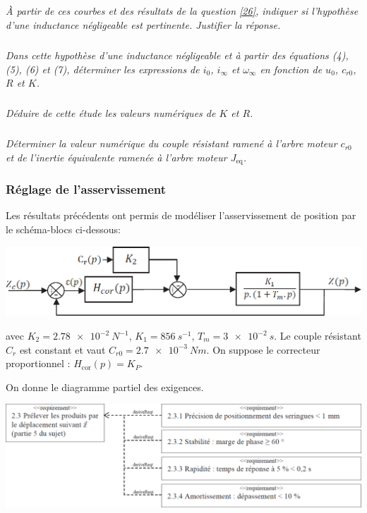 \documentclass[10pt,fleqn]{article} %
\begin{document}
\begin{multicols}{2}
\subparagraph{}\textit{À partir de ces courbes et des résultats de la question \ref{26}, indiquer si l’hypothèse d’une inductance négligeable est pertinente. Justifier la réponse.}

\subparagraph{}\textit{Dans cette hypothèse d’une inductance négligeable et à partir des équations (4), (5), (6) et (7), déterminer les expressions de $i_0$, $i_{\infty}$ et $\omega_{\infty}$ en fonction de $u_0$, $c_{r0}$, $R$ et $K$.}

\subparagraph{}\textit{Déduire de cette étude les valeurs numériques de $K$ et $R$.}

\subparagraph{}\textit{Déterminer la valeur numérique du couple résistant ramené à l’arbre moteur $c_{r0}$ et de l’inertie équivalente ramenée à l’arbre moteur $J_{\text{eq}}$.}


\subsubsection*{Réglage de l’asservissement}
Les résultats précédents ont permis de modéliser l’asservissement de position par le schéma-blocs ci-dessous:

\begin{center}
\includegraphics[width=\linewidth]{images/ccp_11}
\end{center}

avec $K_2 = \SI{2,78e-2}{N^{-1}}$, $K_1  = \SI{856}{s^{-1}}$, $T_m=\SI{3e-2}{s}$. Le couple résistant $C_r$ est constant et vaut $C_{r0} = \SI{2,7e-3}{Nm}$.
On suppose le correcteur proportionnel : $H_{\text{cor}}(p)=K_P$.

On donne le diagramme partiel des exigences.

\begin{center}
\includegraphics[width=\linewidth]{images/ccp_14}
\end{center}




\end{multicols}
\end{document}

